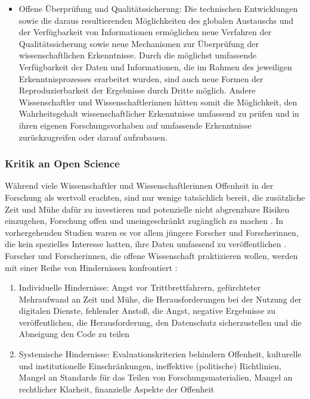 \begin{itemize}
\item Offene Überprüfung und Qualitätssicherung: Die technischen Entwicklungen sowie die daraus resultierenden Möglichkeiten des globalen Austauschs und der Verfügbarkeit von Informationen ermöglichen neue Verfahren der Qualitätssicherung sowie neue Mechanismen zur Überprüfung der wissenschaftlichen Erkenntnisse. Durch die möglichst umfassende Verfügbarkeit der Daten und Informationen, die im Rahmen des jeweiligen Erkenntnisprozesses erarbeitet wurden, sind auch neue Formen der Reproduzierbarkeit der Ergebnisse durch Dritte möglich. Andere Wissenschaftler und Wissenschaftlerinnen hätten somit die Möglichkeit, den Wahrheitsgehalt wissenschaftlicher Erkenntnisse umfassend zu prüfen und in ihren eigenen Forschungsvorhaben auf umfassende Erkenntnisse zurückzugreifen oder darauf aufzubauen.
\end{itemize}

\subsubsection{Kritik an Open Science}

Während viele Wissenschaftler und Wissenschaftlerinnen Offenheit in der Forschung als wertvoll erachten, sind nur wenige tatsächlich bereit, die zusätzliche Zeit und Mühe dafür zu investieren und potenzielle nicht abgrenzbare Risiken einzugehen, Forschung offen und uneingeschränkt zugänglich zu machen \cite{Scheliga_2014} \cite{Tenopir_2011} \cite{Procter_2010}. In vorhergehenden Studien waren es vor allem jüngere Forscher und Forscherinnen, die kein spezielles Interesse hatten, ihre Daten umfassend zu veröffentlichen \cite{Tenopir_2011}. Forscher und Forscherinnen, die offene Wissenschaft praktizieren wollen, werden mit einer Reihe von Hindernissen konfrontiert \cite{Scheliga_2014}:
\begin{enumerate}
\item Individuelle Hindernisse: Angst vor Trittbrettfahrern, gefürchteter Mehraufwand an Zeit und Mühe, die Herausforderungen bei der Nutzung der digitalen Dienste, fehlender Anstoß, die Angst, negative Ergebnisse zu veröffentlichen, die Herausforderung, den Datenschutz sicherzustellen und die Abneigung den Code zu teilen
\item Systemische Hindernisse: Evaluationskriterien behindern Offenheit, kulturelle und institutionelle Einschränkungen, ineffektive (politische) Richtlinien, Mangel an Standards für das Teilen von Forschungsmaterialien, Mangel an rechtlicher Klarheit, finanzielle Aspekte der Offenheit
\end{enumerate}

